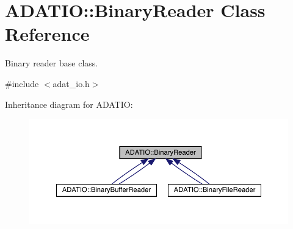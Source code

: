 \hypertarget{classADATIO_1_1BinaryReader}{}\section{A\+D\+A\+T\+IO\+:\+:Binary\+Reader Class Reference}
\label{classADATIO_1_1BinaryReader}


Binary reader base class.  




{\ttfamily \#include $<$adat\+\_\+io.\+h$>$}



Inheritance diagram for A\+D\+A\+T\+IO\+:\nopagebreak
\begin{figure}[H]
\begin{center}
\leavevmode
\includegraphics[width=350pt]{d9/d56/classADATIO_1_1BinaryReader__inherit__graph}
\end{center}
\end{figure}

